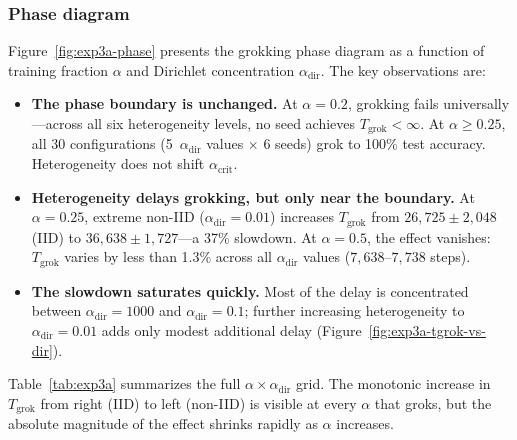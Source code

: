 \documentclass[11pt]{article}
\begin{document}
\subsubsection{Phase diagram}

Figure~\ref{fig:exp3a-phase} presents the grokking phase diagram as a function
of training fraction $\alpha$ and Dirichlet concentration
$\alpha_{\mathrm{dir}}$.  The key observations are:

\begin{itemize}
  \item \textbf{The phase boundary is unchanged.}  At $\alpha{=}0.2$, grokking
        fails universally---across all six heterogeneity levels, no seed
        achieves $T_{\mathrm{grok}} < \infty$.  At $\alpha \geq 0.25$, all
        30 configurations (5~$\alpha_{\mathrm{dir}}$ values $\times$ 6
        seeds) grok to 100\% test accuracy.  Heterogeneity does not shift
        $\alpha_{\mathrm{crit}}$.

  \item \textbf{Heterogeneity delays grokking, but only near the boundary.}
        At $\alpha{=}0.25$, extreme non-IID ($\alpha_{\mathrm{dir}}{=}0.01$)
        increases $T_{\mathrm{grok}}$ from $26{,}725 \pm 2{,}048$ (IID) to
        $36{,}638 \pm 1{,}727$---a 37\% slowdown.  At $\alpha{=}0.5$, the
        effect vanishes: $T_{\mathrm{grok}}$ varies by less than 1.3\% across
        all $\alpha_{\mathrm{dir}}$ values ($7{,}638$--$7{,}738$ steps).

  \item \textbf{The slowdown saturates quickly.}  Most of the delay is
        concentrated between $\alpha_{\mathrm{dir}}{=}1000$ and
        $\alpha_{\mathrm{dir}}{=}0.1$; further increasing heterogeneity to
        $\alpha_{\mathrm{dir}}{=}0.01$ adds only modest additional delay
        (Figure~\ref{fig:exp3a-tgrok-vs-dir}).
\end{itemize}

Table~\ref{tab:exp3a} summarizes the full $\alpha \times
\alpha_{\mathrm{dir}}$ grid.  The monotonic increase in $T_{\mathrm{grok}}$
from right (IID) to left (non-IID) is visible at every $\alpha$ that groks,
but the absolute magnitude of the effect shrinks rapidly as $\alpha$ increases.
\end{document}
